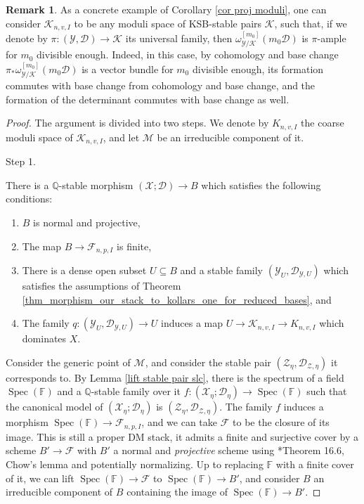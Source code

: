 \documentclass{amsart}
\newcommand{\bQ}{\mathbb{Q}}
\newcommand{\sD}{\mathscr{D}}
\newcommand{\sF}{\mathscr{F}}
\newcommand{\sK}{\mathscr{K}}
\newcommand{\cD}{\mathcal{D}}
\newcommand{\cF}{\mathcal{F}}
\newcommand{\cK}{\mathcal{K}}
\newcommand{\cM}{\mathcal{M}}
\newcommand{\cX}{\mathcal{X}}
\newcommand{\cY}{\mathcal{Y}}
\newcommand{\cZ}{\mathcal{Z}}
\newcommand{\spec}{\operatorname{Spec}}
\newcommand{\sY}{\mathscr{Y}}
\theoremstyle{definition}
\newtheorem{Remark}[theorem]{Remark}
\begin{document}
\begin{Remark}
As a concrete example of Corollary \ref{cor proj moduli}, one can consider $\cK_{n,v,I}$ to be any moduli space of KSB-stable pairs $\sK$, such that, if we denote by $\pi \colon (\sY,\sD)\to \sK$ its universal family, then $\omega_{\sY/\sK}^{[m_0]}(m_0\sD)$ is $\pi$-ample for $m_0$ divisible enough.
Indeed, in this case, by cohomology and base change $\pi_*\omega_{\sY/\sK}^{[m_0]}(m_0\sD)$ is a vector bundle for $m_0$ divisible enough, its formation commutes with base change from cohomology and base change, and the formation of the determinant commutes with base change as well.
\end{Remark}

\begin{proof}
The argument is divided into two steps. We denote by $K_{n,v,I}$ the coarse moduli space of $\cK_{n,v,I}$, and let $\cM$ be an irreducible component of it.

\begin{bf}Step 1.\end{bf} There is a $\bQ$-stable morphism $(\cX;\cD)\to B$ which satisfies the following conditions:
\begin{enumerate}
    \item $B$ is normal and projective,
    \item The map $B\to \sF_{n,p,I}$ is finite,
    \item There is a dense open subset $U\subseteq B$ and a stable family $(\cY_U,\cD_{\cY, U})$ which satisfies the assumptions of Theorem \ref{thm_morphism_our_stack_to_kollars_one_for_reduced_bases}, and
    \item The family $q \colon (\cY_U,\cD_{\cY, U})\to U$ induces a map $U\to \cK_{n,v,I} \to K_{n,v,I}$ which dominates $X$.
\end{enumerate}

Consider the generic point of $\cM$, and consider the stable pair $(\cZ_\eta, \cD_{\cZ,\eta})$ it corresponds to. By Lemma \ref{lift stable pair slc}, there is the spectrum of a field $\spec(\mathbb{F})$ and a $\bQ$-stable family over it $f \colon (\cX_\eta; \cD_\eta) \to \spec(\mathbb{F})$ such that the
canonical model of $(\cX_\eta; \cD_\eta)$ is $(\cZ_\eta, \cD_{\cZ,\eta})$. The family $f$ induces a morphism $\spec(\mathbb{F}) \to \sF_{n,p,I}$, and we can take $\cF$ to be the closure of its image. This is still a proper DM stack, it admits a finite and surjective cover by a scheme $B'\to \cF$ with $B'$ a normal and \emph{projective} scheme using \cite{LMB18}*{Theorem 16.6}, Chow's lemma and potentially normalizing. Up to replacing $\mathbb{F}$ with a finite cover of it, we can lift $\spec(\mathbb{F})\to \cF$ to $\spec(\mathbb{F})\to B'$, and consider $B$ an irreducible component of $B$ containing the image of $\spec(\mathbb{F})\to B'$.


\end{proof}
\end{document}
